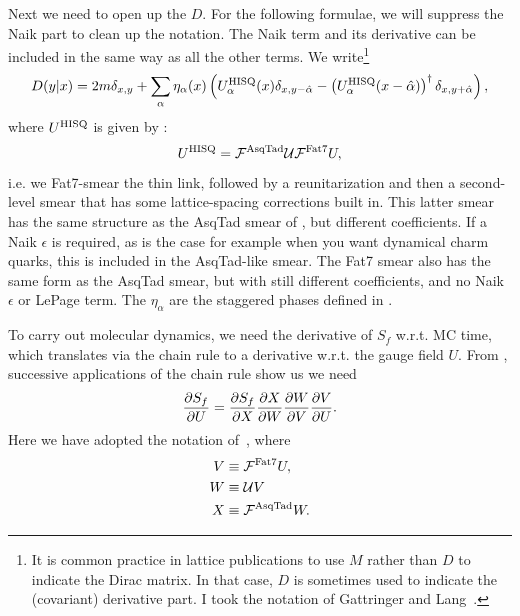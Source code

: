 Next we need to open up the $D$. For the following formulae, we will suppress
the Naik part to clean up the notation. The Naik term and its derivative can be
included in the same way as all the other terms. We write\footnote{It is common practice in
lattice publications to use $M$ rather than $D$ to indicate the Dirac matrix.
In that case, $D$ is sometimes used to indicate the (covariant) derivative part.
I took the notation of Gattringer and Lang~\cite{gattringer_quantum_2010}.}
\begin{equation}\label{eq:DHISQsimple}
D(y|x)=2m\delta_{x,y}
+\sum_\alpha \eta_\alpha(x)\left(U^{\rm HISQ}_\alpha(x)\delta_{x,y-\hat\alpha}
-\left(U^{\rm HISQ}_\alpha(x-\hat\alpha)\right)^\dagger\delta_{x,y+\hat\alpha}\right),
\end{equation}
where $U^{\rm HISQ}$ is given by :
\begin{equation}
U^{\rm HISQ}=\mathcal{F}^{\rm AsqTad}\mathcal{U}\mathcal{F}^{\rm Fat7}U,
\end{equation} 
i.e. we Fat7-smear the thin link, followed
by a reunitarization and then a second-level smear that has some lattice-spacing
corrections built in. This latter smear has the same structure as the AsqTad smear of 
, but different coefficients. If a Naik $\epsilon$ is required,
as is the case for example when you want dynamical charm quarks, this is
included in the AsqTad-like smear. The Fat7 smear also has the same form as the
AsqTad smear, but with still different coefficients, and no Naik $\epsilon$ or
LePage term.
The $\eta_\alpha$ are the staggered phases defined in .

To carry out molecular dynamics, we need the derivative of $S_f$ w.r.t. MC time,
which translates via the chain rule to a derivative w.r.t. the gauge field
$U$. From , successive applications of the chain rule
show us we need
\begin{equation}\label{eq:HISQchainrule}
\pdv{S_f}{U}=\pdv{S_f}{X}\pdv{X}{W}\pdv{W}{V}\pdv{V}{U}.
\end{equation}
Here we have adopted the notation of~\cite{bazavov_scaling_2010},
where
\begin{equation}\begin{aligned}
V&\equiv\mathcal{F}^{\rm Fat7}U,\\
W&\equiv\mathcal{U} V\\
X&\equiv\mathcal{F}^{\rm AsqTad} W.
\end{aligned}\end{equation}

